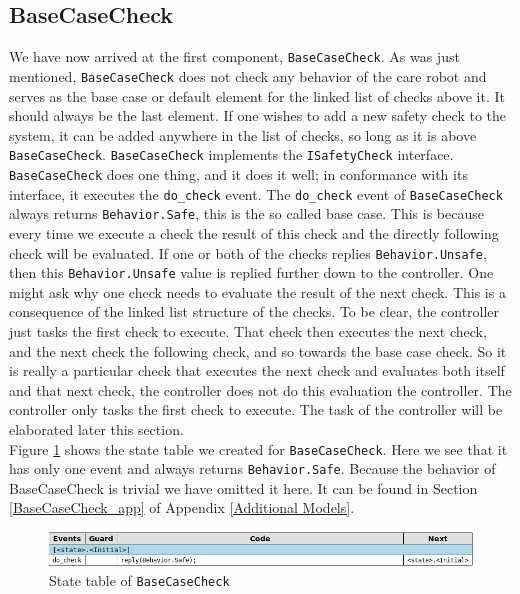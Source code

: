 \documentclass[12pt]{scrreprt}
\begin{document}
\subsection{BaseCaseCheck}
We have now arrived at the first component, \texttt{BaseCaseCheck}. As was just mentioned, \texttt{BaseCaseCheck} does not check any behavior of the care robot and serves as the base case or default element for the linked list of checks above it. It should always be the last element. If one wishes to add a new safety check to the system, it can be added anywhere in the list of checks, so long as it is above \texttt{BaseCaseCheck}. \texttt{BaseCaseCheck} implements the \texttt{ISafetyCheck} interface. \texttt{BaseCaseCheck} does one thing, and it does it well; in conformance with its interface, it executes the \texttt{do\_check} event. The \texttt{do\_check} event of \texttt{BaseCaseCheck} always returns \texttt{Behavior.Safe}, this is the so called base case. This is because every time we execute a check the result of this check and the directly following check will be evaluated. If one or both of the checks replies \texttt{Behavior.Unsafe}, then this \texttt{Behavior.Unsafe} value is replied further down to the controller. One might ask why one check needs to evaluate the result of the next check. This is a consequence of the linked list structure of the checks. To be clear, the controller just tasks the first check to execute. That check then executes the next check, and the next check the following check, and so towards the base case check. So it is really a particular check that executes the next check and evaluates both itself and that next check, the controller does not do this evaluation the controller. The controller only tasks the first check to execute. The task of the controller will be elaborated later this section. 
\\
Figure \ref{fig:basecasechekc_state_table} shows the state table we created for \texttt{BaseCaseCheck}. Here we see that it has only one event and always returns \texttt{Behavior.Safe}. Because the behavior of BaseCaseCheck is trivial we have omitted it here. It can be found in Section \ref{BaseCaseCheck_app} of Appendix \ref{Additional Models}.

\begin{figure}[H]
    \centering
    \includegraphics[width=\textwidth]{Figures/results/modelling_figures/BaseCaseCheck/BaseCaseCheck_state_table.png}
    \caption{State table of \texttt{BaseCaseCheck}}
    \label{fig:basecasechekc_state_table}
\end{figure}
\end{document}
